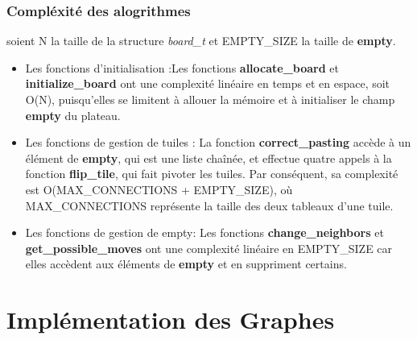 \documentclass[10pt]{article}
\begin{document}
\subsubsection{Compléxité des alogrithmes}
soient N la taille de la structure \textit{board\_t} et \footnotesize {EMPTY\_SIZE} la taille de \textbf{empty}.
\begin{itemize}
    \item Les fonctions d'initialisation :Les fonctions \textbf{allocate\_board} et \textbf{initialize\_board} ont une complexité linéaire en temps et en espace, soit O(N), puisqu'elles se limitent à allouer la mémoire et à initialiser le champ \textbf{empty} du plateau.
    \item Les fonctions de gestion de tuiles : La fonction \textbf{correct\_pasting} accède à un élément de \textbf{empty}, qui est une liste chaînée, et effectue quatre appels à la fonction \textbf{flip\_tile}, qui fait pivoter les tuiles. Par conséquent, sa complexité est O(\footnotesize{MAX\_CONNECTIONS + EMPTY\_SIZE}), où \footnotesize{MAX\_CONNECTIONS} représente la taille des deux tableaux d'une tuile.
    \item Les fonctions de gestion de empty: Les fonctions \textbf{change\_neighbors} et \textbf{get\_possible\_moves} ont une complexité linéaire en \footnotesize{EMPTY\_SIZE} car elles accèdent aux éléments de \textbf{empty} et en suppriment certains.
\end{itemize}

\section{Implémentation des Graphes}
\end{document}
